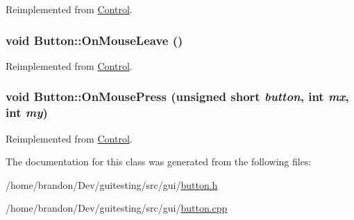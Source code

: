 Reimplemented from \hyperlink{class_control_93451fdae5cd22b9c52374db759c291c}{Control}.\hypertarget{class_button_e6593ca8bb94fe3c54a09bf5cf060cf2}{
\subsubsection[{OnMouseLeave}]{\setlength{\rightskip}{0pt plus 5cm}void Button::OnMouseLeave ()}}
\label{class_button_e6593ca8bb94fe3c54a09bf5cf060cf2}




Reimplemented from \hyperlink{class_control_6f2e2b8b0984a37b64b9113a1fdf683d}{Control}.\hypertarget{class_button_d6b93ae1c85c1dba05424becc7e051f7}{
\subsubsection[{OnMousePress}]{\setlength{\rightskip}{0pt plus 5cm}void Button::OnMousePress (unsigned short {\em button}, \/  int {\em mx}, \/  int {\em my})}}
\label{class_button_d6b93ae1c85c1dba05424becc7e051f7}




Reimplemented from \hyperlink{class_control_17ebdd745fcaf245f8d8ab38fa534072}{Control}.

The documentation for this class was generated from the following files:\begin{CompactItemize}
\item 
/home/brandon/Dev/guitesting/src/gui/\hyperlink{button_8h}{button.h}\item 
/home/brandon/Dev/guitesting/src/gui/\hyperlink{button_8cpp}{button.cpp}\end{CompactItemize}
